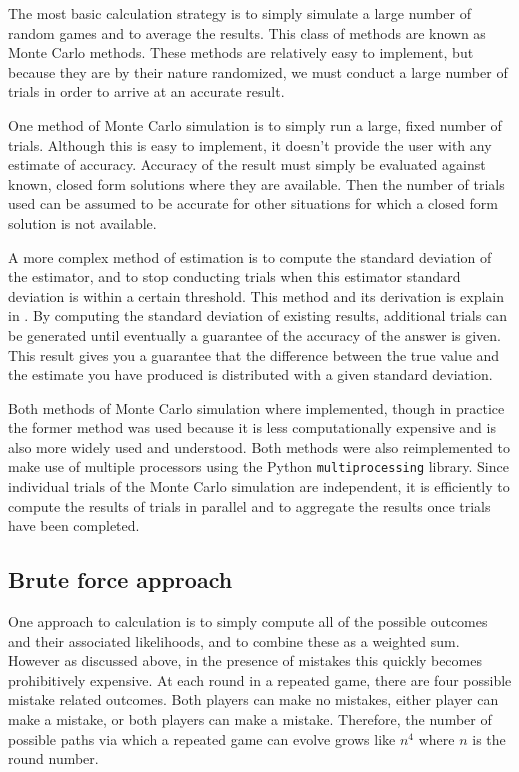 \documentclass[a4paper,12pt]{article}
\begin{document}
The most basic calculation strategy is to simply simulate a large number of random games and to average the results.
This class of methods are known as Monte Carlo methods.
These methods are relatively easy to implement, but because they are by their nature randomized, we must conduct a large number of trials in order to arrive at an accurate result.

One method of Monte Carlo simulation is to simply run a large, fixed number of trials.
Although this is easy to implement, it doesn't provide the user with any estimate of accuracy.
Accuracy of the result must simply be evaluated against known, closed form solutions where they are available.
Then the number of trials used can be assumed to be accurate for other situations for which a closed form solution is not available.

A more complex method of estimation is to compute the standard deviation of the estimator, and to stop conducting trials when this estimator standard deviation is within a certain threshold.
This method and its derivation is explain in \cite{ross}.
By computing the standard deviation of existing results, additional trials can be generated until eventually a guarantee of the accuracy of the answer is given.
This result gives you a guarantee that the difference between the true value and the estimate you have produced is distributed with a given standard deviation.

Both methods of Monte Carlo simulation where implemented, though in practice the former method was used because it is less computationally expensive and is also more widely used and understood.
Both methods were also reimplemented to make use of multiple processors using the Python \texttt{multiprocessing} library.
Since individual trials of the Monte Carlo simulation are independent, it is efficiently to compute the results of trials in parallel and to aggregate the results once trials have been completed.

\subsection{Brute force approach}

One approach to calculation is to simply compute all of the possible outcomes and their associated likelihoods, and to combine these as a weighted sum.
However as discussed above, in the presence of mistakes this quickly becomes prohibitively expensive.
At each round in a repeated game, there are four possible mistake related outcomes.
Both players can make no mistakes, either player can make a mistake, or both players can make a mistake.
Therefore, the number of possible paths via which a repeated game can evolve grows like $n^4$ where $n$ is the round number.
\end{document}
